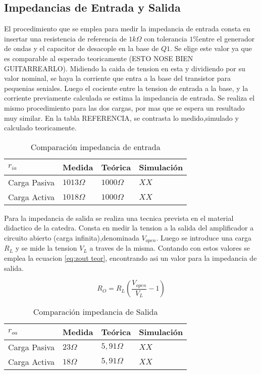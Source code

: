 \subsection{Impedancias de Entrada y Salida}

El procedimiento que se emplea para medir la impedancia de entrada consta en insertar una resistencia de referencia de $1 k\Omega$ con tolerancia $1\%$entre el generador de ondas y el capacitor de desacople en la base de $Q1$. Se elige este valor ya que es comparable al esperado teoricamente (ESTO NOSE BIEN GUITARREARLO).
Midiendo la caida de tension en esta y dividiendo por su valor nominal, se haya la corriente que entra a la base del transistor para pequenias seniales. Luego el cociente entre la tension de entrada a la base, y la corriente previamente calculada se estima la impedancia de entrada.
Se realiza el mismo procedimiento para las dos cargas, por mas que se espera un resultado muy similar. En la tabla REFERENCIA, se contrasta lo medido,simulado y calculado teoricamente.

\begin{table}[ht]
    \centering
    \begin{tabular}{|l|l|l|l|}
    \hline
    $r_{ia}$     & Medida       & Teórica         & Simulación \\ \hline
    Carga Pasiva & $1013\Omega$ & $1000\Omega $   &  $XX $          \\ \hline
    Carga Activa & $1018\Omega$ & $1000\Omega $  &  $XX $          \\ \hline
    \end{tabular}
    \caption{Comparación impedancia de entrada}\label{table:Ri comp}
\end{table}

Para la impedancia de salida se realiza una tecnica prevista en el material didactico de la catedra. Consta en medir la tension a la salida del amplificador a circuito abierto (carga infinita),denominada $V_{open}$. Luego se introduce una carga $R_L$ y se mide la tension $V_L$ a traves de la misma.
Contando con estos valores se emplea la ecuacion \ref{eq:zout teor}, encontrando asi un valor para la impedancia de salida.

\begin{equation}
    R_O = R_L(\frac{V_{open}}{V_L}-1)
    \label{eq:zout teor}
\end{equation}

\begin{table}[ht]
    \centering
    \begin{tabular}{|l|l|l|l|}
    \hline
    $r_{oa}$     & Medida     & Teórica         & Simulación \\ \hline
    Carga Pasiva & $23\Omega$ & $5,91\Omega $   &  $XX $          \\ \hline
    Carga Activa & $18\Omega$ &  $5,91\Omega $  &  $XX $          \\ \hline
    \end{tabular}
    \caption{Comparación impedancia de Salida}\label{table:Ro comp}
\end{table}


